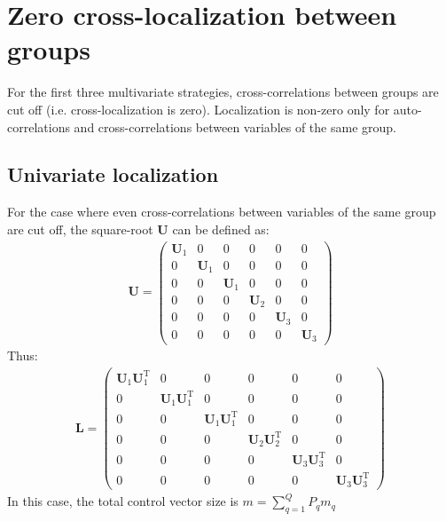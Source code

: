 \documentclass[12pt]{scrartcl}
\begin{document}
\section{Zero cross-localization between groups}
For the first three multivariate strategies, cross-correlations between groups are cut off (i.e. cross-localization is zero). Localization is non-zero only for auto-correlations and cross-correlations between variables of the same group.

\subsection{Univariate localization}
For the case where even cross-correlations between variables of the same group are cut off, the square-root $\mathbf{U}$ can be defined as:
\begin{align}
\mathbf{U} = \left( \begin{array}{ccc|c|cc}
\mathbf{U}_1 & 0 & 0 & 0 & 0 & 0 \\
0 & \mathbf{U}_1 & 0 & 0 & 0 & 0 \\
0 & 0 & \mathbf{U}_1 & 0 & 0 & 0 \\[0.3ex]
\hline
0 & 0 & 0 & \mathbf{U}_2 & 0 & 0 \\[0.3ex]
\hline
0 & 0 & 0 & 0 & \mathbf{U}_3 & 0 \\
0 & 0 & 0 & 0 & 0 & \mathbf{U}_3
\end{array} \right)
\end{align}
Thus:
\begin{align}
\mathbf{L} = \left( \begin{array}{ccc|c|cc}
\mathbf{U}_1 \mathbf{U}_1^\mathrm{T} & 0 & 0 & 0 & 0 & 0 \\
0 & \mathbf{U}_1 \mathbf{U}_1^\mathrm{T} & 0 & 0 & 0 & 0 \\
0 & 0 & \mathbf{U}_1 \mathbf{U}_1^\mathrm{T} & 0 & 0 & 0 \\[0.3ex]
\hline
0 & 0 & 0 & \mathbf{U}_2 \mathbf{U}_2^\mathrm{T} & 0 & 0 \\[0.3ex]
\hline
0 & 0 & 0 & 0 & \mathbf{U}_3 \mathbf{U}_3^\mathrm{T} & 0 \\
0 & 0 & 0 & 0 & 0 & \mathbf{U}_3 \mathbf{U}_3^\mathrm{T}
\end{array} \right)
\end{align}
In this case, the total control vector size is $\displaystyle m = \sum_{q=1}^Q P_q m_q$
\end{document}
